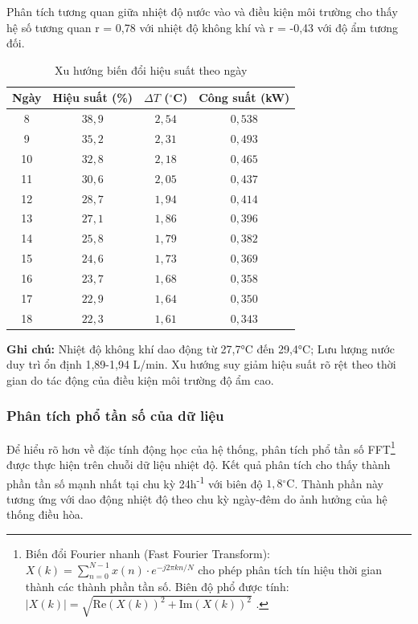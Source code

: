 \documentclass[../main.tex]{subfiles}
\begin{document}
Phân tích tương quan giữa nhiệt độ nước vào và điều kiện môi trường cho thấy hệ số tương quan r = 0,78 với nhiệt độ không khí và r = -0,43 với độ ẩm tương đối.

\begin{table}[H]
\centering
\renewcommand{\arraystretch}{1.1}
\caption{Xu hướng biến đổi hiệu suất theo ngày}
\label{tab:daily_performance_trend}
\begin{tabular}{|c|c|c|c|}
\hline
\textbf{Ngày} & \textbf{Hiệu suất (\%)} & \textbf{$\Delta T$ ($^\circ$C)} & \textbf{Công suất (kW)} \\
\hline
8 & $38,9$ & $2,54$ & $0,538$ \\
\hline
9 & $35,2$ & $2,31$ & $0,493$ \\
\hline
10 & $32,8$ & $2,18$ & $0,465$ \\
\hline
11 & $30,6$ & $2,05$ & $0,437$ \\
\hline
12 & $28,7$ & $1,94$ & $0,414$ \\
\hline
13 & $27,1$ & $1,86$ & $0,396$ \\
\hline
14 & $25,8$ & $1,79$ & $0,382$ \\
\hline
15 & $24,6$ & $1,73$ & $0,369$ \\
\hline
16 & $23,7$ & $1,68$ & $0,358$ \\
\hline
17 & $22,9$ & $1,64$ & $0,350$ \\
\hline
18 & $22,3$ & $1,61$ & $0,343$ \\
\hline
\end{tabular}
\end{table}

\textbf{Ghi chú:} Nhiệt độ không khí dao động từ 27,7°C đến 29,4°C; Lưu lượng nước duy trì ổn định 1,89-1,94 L/min. Xu hướng suy giảm hiệu suất rõ rệt theo thời gian do tác động của điều kiện môi trường độ ẩm cao.

\subsubsection{Phân tích phổ tần số của dữ liệu}
\label{sec:frequency_analysis}

Để hiểu rõ hơn về đặc tính động học của hệ thống, phân tích phổ tần số FFT\footnote{Biến đổi Fourier nhanh (Fast Fourier Transform): $X(k) = \sum_{n=0}^{N-1} x(n) \cdot e^{-j2\pi kn/N}$ cho phép phân tích tín hiệu thời gian thành các thành phần tần số. Biên độ phổ được tính: $|X(k)| = \sqrt{\text{Re}(X(k))^2 + \text{Im}(X(k))^2}$ \cite{stull2011meteorology}.} được thực hiện trên chuỗi dữ liệu nhiệt độ. Kết quả phân tích cho thấy thành phần tần số mạnh nhất tại chu kỳ 24h\textsuperscript{-1} với biên độ $1,8{^\circ\mathrm{C}}$. Thành phần này tương ứng với dao động nhiệt độ theo chu kỳ ngày-đêm do ảnh hưởng của hệ thống điều hòa.
\end{document}
